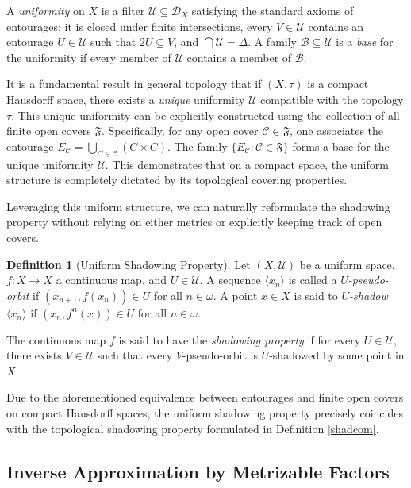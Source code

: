 \documentclass[12pt]{amsart}
\theoremstyle{definition}
\newtheorem{definition}[theorem]{Definition}
\numberwithin{equation}{section}
\theoremstyle{remark}
\begin{document}
A \emph{uniformity} on $X$ is a filter $\mathcal{U} \subseteq \mathcal{D}_X$ satisfying the standard axioms of entourages: it is closed under finite intersections, every $V \in \mathcal{U}$ contains an entourage $U \in \mathcal{U}$ such that $2U \subseteq V$, and $\bigcap \mathcal{U} = \Delta$. A family $\mathcal{B} \subseteq \mathcal{U}$ is a \emph{base} for the uniformity if every member of $\mathcal{U}$ contains a member of $\mathcal{B}$.

It is a fundamental result in general topology \cite[Section 8.3]{Eng} that if $(X, \tau)$ is a compact Hausdorff space, there exists a \emph{unique} uniformity $\mathcal{U}$ compatible with the topology $\tau$. This unique uniformity can be explicitly constructed using the collection of all finite open covers $\mathfrak{F}$. Specifically, for any open cover $\mathcal{C} \in \mathfrak{F}$, one associates the entourage $E_{\mathcal{C}} = \bigcup_{C \in \mathcal{C}} (C \times C)$. The family $\{ E_{\mathcal{C}} : \mathcal{C} \in \mathfrak{F} \}$ forms a base for the unique uniformity $\mathcal{U}$. This demonstrates that on a compact space, the uniform structure is completely dictated by its topological covering properties.

Leveraging this uniform structure, we can naturally reformulate the shadowing property without relying on either metrics or explicitly keeping track of open covers.

\begin{definition}[Uniform Shadowing Property]
Let $(X, \mathcal{U})$ be a uniform space, $f: X \to X$ a continuous map, and $U \in \mathcal{U}$. A sequence $\langle x_n \rangle$ is called a \emph{$U$-pseudo-orbit} if $(x_{n+1}, f(x_n)) \in U$ for all $n \in \omega$. A point $x \in X$ is said to \emph{$U$-shadow} $\langle x_n \rangle$ if $(x_n, f^n(x)) \in U$ for all $n \in \omega$. 

The continuous map $f$ is said to have the \emph{shadowing property} if for every $U \in \mathcal{U}$, there exists $V \in \mathcal{U}$ such that every $V$-pseudo-orbit is $U$-shadowed by some point in $X$.
\end{definition}

Due to the aforementioned equivalence between entourages and finite open covers on compact Hausdorff spaces, the uniform shadowing property precisely coincides with the topological shadowing property formulated in Definition \ref{shadcom}.

\subsection{Inverse Approximation by Metrizable Factors}
\end{document}
